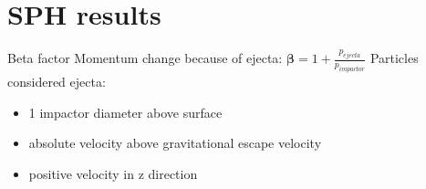 \documentclass{beamer}
\begin{document}
\section{SPH results}
\begin{frame}{Beta factor}
Momentum change because of ejecta: $\boldsymbol{\beta} = 1 + \frac{p_{ejecta}}{p_{impactor}}$
\vfill
Particles considered ejecta:
\begin{itemize}
	\item 1 impactor diameter above surface \pause
	\item absolute velocity above gravitational escape velocity \pause
	\item positive velocity in z direction \pause
\end{itemize} 
\end{frame}

\end{document}
